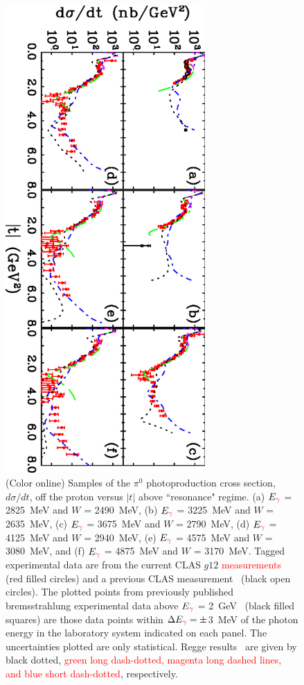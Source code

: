 \documentclass[aps,prc,twocolumn,floatfix,showpacs,preprintnumbers,amsmath,amssymb,superscriptaddress,linenumbers]{revtex4-1}
\begin{document}
\begin{figure}[htb!]
\centerline{
        \includegraphics[width=3in, angle=90]{dsdt.eps}}

        \caption {(Color online) Samples of the $\pi^0$ photoproduction 
	cross section, $d\sigma/dt$, off the proton versus $|t|$ 
	above ``resonance" regime.  
	(a) $E_{\textcolor{red}{\gamma}}$ = 2825~MeV and $W$ = 2490~MeV, 
	(b) $E_{\textcolor{red}{\gamma}} $ = 3225~MeV and $W$ = 2635~MeV,
	(c) $E_{\textcolor{red}{\gamma}}$ = 3675~MeV and $W$ = 2790~MeV, 
	(d) $E_{\textcolor{red}{\gamma}}$ = 4125~MeV and $W$ = 2940~MeV,
	(e) $E_{\textcolor{red}{\gamma}}$ = 4575~MeV and $W$ = 3080~MeV, and
	(f) $E_{\textcolor{red}{\gamma}}$ = 4875~MeV and $W$ = 3170~MeV.
	Tagged experimental data are from the current CLAS $g12$ \textcolor{red}{measurements} (red 
	filled circles) and a previous CLAS 
	measurement~\protect\cite{Dugger:2007bt} (black open circles). 
	The plotted points from previously published bremsstrahlung 
	experimental data above $E_{\textcolor{red}{\gamma}}$ = 2~GeV~\protect\cite{brem} (black 
	filled squares) are those data points within $\Delta E_{\textcolor{red}{\gamma}} = 
	\pm$3~MeV of the photon energy in the laboratory system 
	indicated on each panel. The uncertainties plotted are only 
	statistical. 
	Regge results~\protect\cite{Goldstein:1973xn,Laget:2005be,
	Mathieu:2015eia,Donnachie:2015jaa} are given by black dotted, 
	\textcolor{red}{green long dash-dotted, magenta long 
	dashed lines, and blue short dash-dotted}, respectively.} 
	\label{fig:t_data}
\end{figure}
\end{document}
